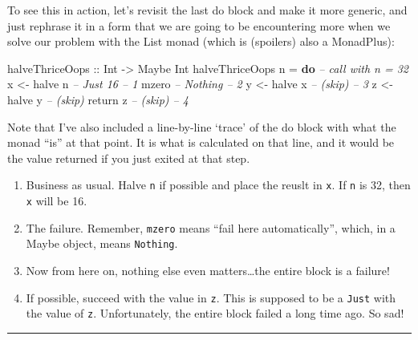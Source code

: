 \documentclass[]{article}
\newenvironment{Shaded}{}{}
\newcommand{\KeywordTok}[1]{\textcolor[rgb]{0.00,0.44,0.13}{\textbf{{#1}}}}
\newcommand{\DataTypeTok}[1]{\textcolor[rgb]{0.56,0.13,0.00}{{#1}}}
\newcommand{\CommentTok}[1]{\textcolor[rgb]{0.38,0.63,0.69}{\textit{{#1}}}}
\newcommand{\OtherTok}[1]{\textcolor[rgb]{0.00,0.44,0.13}{{#1}}}
\newcommand{\FunctionTok}[1]{\textcolor[rgb]{0.02,0.16,0.49}{{#1}}}
\newcommand{\NormalTok}[1]{{#1}}
\begin{document}
To see this in action, let's revisit the last do block and make it more
generic, and just rephrase it in a form that we are going to be
encountering more when we solve our problem with the List monad (which
is (spoilers) also a MonadPlus):

\begin{Shaded}
\begin{Highlighting}[]
\OtherTok{halveThriceOops ::} \DataTypeTok{Int} \OtherTok{->} \DataTypeTok{Maybe} \DataTypeTok{Int}
\NormalTok{halveThriceOops n }\FunctionTok{=} \KeywordTok{do}          \CommentTok{-- call with n = 32}
    \NormalTok{x }\OtherTok{<-} \NormalTok{halve n                }\CommentTok{-- Just 16              -- 1}
    \NormalTok{mzero                       }\CommentTok{-- Nothing              -- 2}
    \NormalTok{y }\OtherTok{<-} \NormalTok{halve x                }\CommentTok{-- (skip)               -- 3}
    \NormalTok{z }\OtherTok{<-} \NormalTok{halve y                }\CommentTok{-- (skip)}
    \NormalTok{return z                    }\CommentTok{-- (skip)               -- 4}
\end{Highlighting}
\end{Shaded}

Note that I've also included a line-by-line `trace' of the do block with
what the monad ``is'' at that point. It is what is calculated on that
line, and it would be the value returned if you just exited at that
step.

\begin{enumerate}
\def\labelenumi{\arabic{enumi}.}
\tightlist
\item
  Business as usual. Halve \texttt{n} if possible and place the reuslt
  in \texttt{x}. If \texttt{n} is 32, then \texttt{x} will be 16.
\item
  The failure. Remember, \texttt{mzero} means ``fail here
  automatically'', which, in a Maybe object, means \texttt{Nothing}.
\item
  Now from here on, nothing else even matters\ldots{}the entire block is
  a failure!
\item
  If possible, succeed with the value in \texttt{z}. This is supposed to
  be a \texttt{Just} with the value of \texttt{z}. Unfortunately, the
  entire block failed a long time ago. So sad!
\end{enumerate}

\begin{center}\rule{0.5\linewidth}{\linethickness}\end{center}
\end{document}
